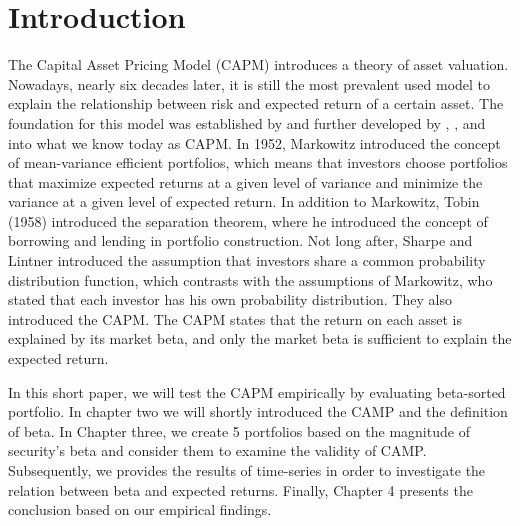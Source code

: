 \documentclass[12pt,a4paper]{article}
\begin{document}
\section{Introduction}
The Capital Asset Pricing Model (CAPM) introduces a theory of asset valuation. Nowadays, nearly six decades later, it is still the most prevalent used model to explain the relationship between risk and expected return of a certain asset. The foundation for this model was established by  and further developed by , , and  into what we know today as CAPM. In 1952, Markowitz introduced the concept of mean-variance efficient portfolios, which means that investors choose portfolios that maximize expected returns at a given level of variance and minimize the variance at a given level of expected return. In addition to Markowitz, Tobin (1958) introduced the separation theorem, where he introduced the concept of borrowing and lending in portfolio construction. Not long after, Sharpe and Lintner introduced the assumption that investors share a common probability distribution function, which contrasts with the assumptions of Markowitz, who stated that each investor has his own probability distribution. They also introduced the CAPM. The CAPM states that the return on each asset is explained by its market beta, and only the market beta is sufficient to explain the expected return.

In this short paper, we will test the CAPM empirically by evaluating beta-sorted portfolio. In chapter two we will shortly introduced the CAMP and the definition of beta. In Chapter three, we create 5 portfolios based on the magnitude of security's beta and consider them to examine the validity of CAMP. Subsequently, we provides the results of time-series in order to investigate the relation between beta and expected returns. Finally, Chapter 4 presents the conclusion based on our empirical findings.
\end{document}
